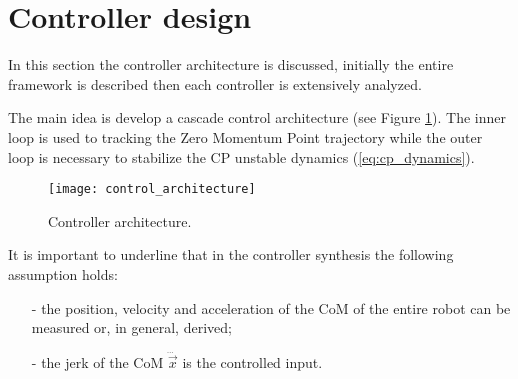 \section{Controller design}
In this section the controller architecture is discussed, initially the entire framework
is described then each controller is extensively analyzed.
\par
The main idea is develop a cascade control architecture (see Figure \ref{fig:control_architecuture}).
The inner loop is used to tracking the
Zero Momentum Point trajectory while the outer loop is necessary to stabilize the
CP unstable dynamics (\ref{eq:cp_dynamics}).
\begin{figure}[!ht]
  \centering
  \texttt{[image: control\_architecture]}
  \caption{Controller architecture. \label{fig:control_architecuture}}
\end{figure}
\par
It is important to underline that in the controller synthesis the following assumption holds:
\begin{itemize}
\item[-] the position, velocity and acceleration of the CoM of the entire robot can be measured or,
  in general, derived;
\item[-] the jerk of the CoM $\dddot{\vec{x}}$ is the controlled input.
\end{itemize}

